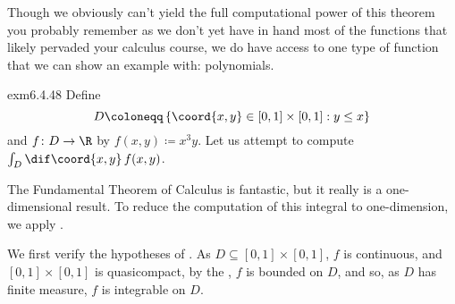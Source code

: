 Though we obviously can't yield the full computational power of this theorem you probably remember as we don't yet have in hand most of the functions that likely pervaded your calculus course, we do have access to one type of function that we can show an example with:  polynomials.
\begin{exm}{}{exm6.4.48}
Define
\begin{equation}
D\coloneqq \left\{ \coord{x,y}\in [0,1]\times [0,1]:y\leq x\right\}
\end{equation}
and $f\colon D\rightarrow \R$ by $f(x,y)\coloneqq x^3y$.  Let us attempt to compute $\int _D\dif \coord{x,y}\, f(x,y)$.

The Fundamental Theorem of Calculus is fantastic, but it really is a one-dimensional result.  To reduce the computation of this integral to one-dimension, we apply .

We first verify the hypotheses of .  As $D\subseteq [0,1]\times [0,1]$, $f$ is continuous, and $[0,1]\times [0,1]$ is quasicompact, by the , $f$ is bounded on $D$, and so, as $D$ has finite measure, $f$ is integrable on $D$.


\end{exm}
